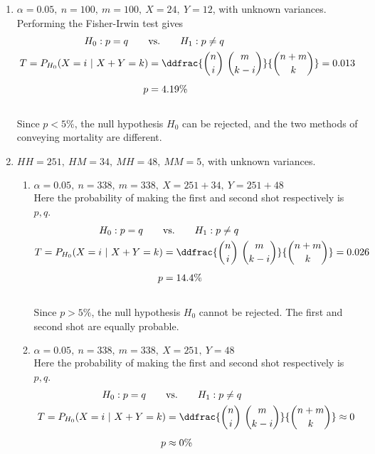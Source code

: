 \begin{enumerate}
	\item $\alpha = 0.05,\ n = 100,\ m = 100,\ X = 24,\ Y = 12$, with unknown variances. Performing the Fisher-Irwin test gives\\
	
	\begin{align}
		H_0 : p  = q \qquad &\text{vs.} \qquad H_1 : p  \neq q \nonumber \\
		T = P_{H_0}(X = i\ |\ X+Y = k) &= \ddfrac{\binom{n}{i}\ \binom{m}{k-i}}{\binom{n+m}{k}} = 0.013 \nonumber \\[1ex]
		p &= 4.19\%
	\end{align}\\
		
	Since $ p < 5\% $, the null hypothesis $ H_0 $ can be rejected, and the two methods of conveying mortality are different.\\
	
	\item $HH = 251,\ HM = 34,\ MH = 48,\ MM = 5$, with unknown variances.\\
	
	\begin{enumerate}
		
		\item $\alpha = 0.05,\ n = 338,\ m = 338,\ X = 251+34,\ Y = 251+48$\\
		Here the probability of making the first and second shot respectively is $ p, q $.\\
		\begin{align}
			H_0 : p = q \qquad &\text{vs.} \qquad H_1 : p  \neq q \nonumber \\
			T = P_{H_0}(X = i\ |\ X+Y = k) &= \ddfrac{\binom{n}{i}\ \binom{m}{k-i}}{\binom{n+m}{k}} = 0.026 \nonumber \\[1ex]
			p &= 14.4\%
		\end{align}\\
		
		Since $ p > 5\% $, the null hypothesis $ H_0 $ cannot be rejected. The first and second shot are equally probable.\\


		\item $\alpha = 0.05,\ n = 338,\ m = 338,\ X = 251,\ Y = 48$\\
		Here the probability of making the first and second shot respectively is $ p, q $.\\
		\begin{align}
			H_0 : p = q \qquad &\text{vs.} \qquad H_1 : p  \neq q \nonumber \\
			T = P_{H_0}(X = i\ |\ X+Y = k) &= \ddfrac{\binom{n}{i}\ \binom{m}{k-i}}{\binom{n+m}{k}} \approx 0 \nonumber \\[1ex]
			p &\approx 0\%
		\end{align}\\
		

\end{enumerate}
\end{enumerate}

